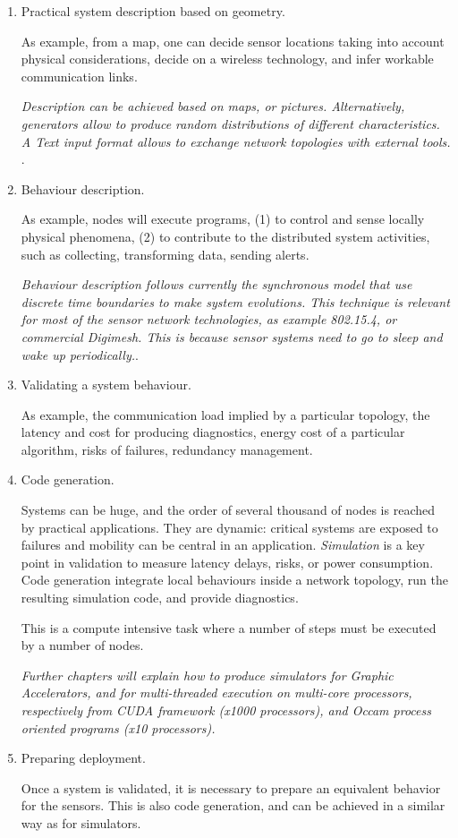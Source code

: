 \documentclass[times]{book}
\begin{document}
\begin{enumerate}
\item Practical system description based on geometry.

As example, from a map, one can decide sensor locations taking into account physical considerations, decide
on a wireless technology, and infer workable communication links.

{\sl Description can be achieved based on maps, or pictures. Alternatively, generators allow to produce 
random distributions of different characteristics. A Text input format allows to exchange network topologies with external tools. }.

\item Behaviour description.

As example, nodes will execute programs, (1) to control and sense  locally  physical phenomena, (2) 
to  contribute to the distributed system activities, such as collecting, transforming  data, sending alerts.


{\sl Behaviour description follows currently the synchronous model that use discrete time boundaries 
to make system evolutions. This technique is relevant for most of the sensor network technologies, 
as example 802.15.4, or commercial Digimesh. This is because sensor systems need to go to sleep
and wake up periodically.}.


\item Validating a system behaviour.

As example, the communication load implied by a particular topology, the latency and cost for producing
diagnostics, energy cost of a particular algorithm, risks of failures, redundancy management.

 
\item Code generation.

Systems can be huge, and the order of several thousand of nodes is reached by practical applications.
They are dynamic: critical systems are exposed to failures and mobility can be central in an application.
{\sl Simulation } is a key point in validation to measure latency delays, risks, or power consumption.
Code generation integrate local behaviours inside a network topology,   run the resulting simulation code, 
and provide diagnostics.

This is a compute intensive task where a number of steps must be executed by a number of nodes.

{\sl 
Further chapters will explain how to produce simulators for Graphic Accelerators, and for multi-threaded
execution on multi-core processors, respectively from CUDA framework (x1000 processors), and
Occam process oriented programs (x10 processors).}

\item Preparing deployment.

Once a system is validated, it is necessary to prepare an  equivalent behavior for the sensors. This is also
code generation, and can be achieved in a similar way as for simulators.
\end{enumerate}
\end{document}
